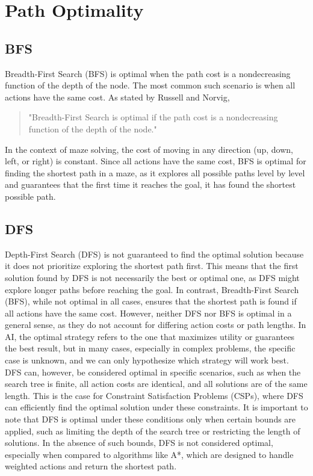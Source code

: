 \documentclass[final, journal, 11pt]{report}
\begin{document}
		
		
	
	
	\section*{Path Optimality}
		\subsection*{BFS}
		
		Breadth-First Search (BFS) is optimal when the path cost is a nondecreasing function of the depth of the node. The most common such scenario is when all actions have the same cost. As stated by Russell and Norvig,
		
		\begin{quote}
		    "Breadth-First Search is optimal if the path cost is a nondecreasing function of the depth of the node."
		\end{quote}
		
		In the context of maze solving, the cost of moving in any direction (up, down, left, or right) is constant. Since all actions have the same cost, BFS is optimal for finding the shortest path in a maze, as it explores all possible paths level by level and guarantees that the first time it reaches the goal, it has found the shortest possible path.
		
		\subsection*{DFS}
		Depth-First Search (DFS) is not guaranteed to find the optimal solution because it does not prioritize exploring the shortest path first. This means that the first solution found by DFS is not necessarily the best or optimal one, as DFS might explore longer paths before reaching the goal. In contrast, Breadth-First Search (BFS), while not optimal in all cases, ensures that the shortest path is found if all actions have the same cost. However, neither DFS nor BFS is optimal in a general sense, as they do not account for differing action costs or path lengths. In AI, the optimal strategy refers to the one that maximizes utility or guarantees the best result, but in many cases, especially in complex problems, the specific case is unknown, and we can only hypothesize which strategy will work best. DFS can, however, be considered optimal in specific scenarios, such as when the search tree is finite, all action costs are identical, and all solutions are of the same length. This is the case for Constraint Satisfaction Problems (CSPs), where DFS can efficiently find the optimal solution under these constraints. It is important to note that DFS is optimal under these conditions only when certain bounds are applied, such as limiting the depth of the search tree or restricting the length of solutions. In the absence of such bounds, DFS is not considered optimal, especially when compared to algorithms like A*, which are designed to handle weighted actions and return the shortest path.
		
\end{document}
